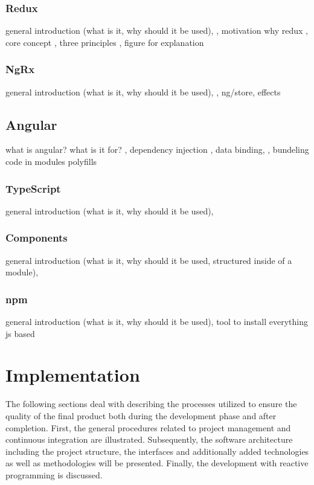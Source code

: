\documentclass[Bachelor,BIF,english]{twbook}
\begin{document}
\subsection{Redux}
general introduction (what is it, why should it be used), \cite{Redux}, motivation why redux \cite{ReduxIntroMoti}, core concept \cite{ReduxIntroCC}, three principles \cite{ReduxIntro3P}, figure for explanation

\subsection{NgRx}
general introduction (what is it, why should it be used), \cite{Ngrx}, ng/store, effects


\section{Angular}
what is angular? what is it for? \cite[p.~xxiv-xxix]{RxAngular5Prj}, dependency injection \cite[p.~]{YakovFainAngular} \cite[p.~211]{RxAngular5Prj}, data binding, \cite[p.~]{YakovFainAngular}, bundeling code in modules \cite[p.~116]{RxAngular5Prj}
polyfills \cite[p.~18]{RxAngular5Prj}

\subsection{TypeScript}
general introduction \cite[p.~19]{RxAngular5Prj} \cite{TypeScript} \cite[p.~41]{RxAngular5Prj} (what is it, why should it be used),

\subsection{Components}
general introduction \cite[p.~22]{RxAngular5Prj} \cite[p.~89]{RxAngular5Prj} \cite[p.~159]{RxAngular5Prj} (what is it, why should it be used, structured inside of a module), 

\subsection{npm}
general introduction \cite[p.~71]{RxAngular5Prj} (what is it, why should it be used), 
tool to install everything js based

\clearpage 

\chapter{Implementation}
The following sections deal with describing the processes utilized to ensure the quality of the final product both during the development phase and after completion. First, the general procedures related to project management and continuous integration are illustrated. Subsequently, the software architecture including the project structure, the interfaces and additionally added technologies as well as methodologies will be presented. Finally, the development with reactive programming is discussed.
\end{document}

